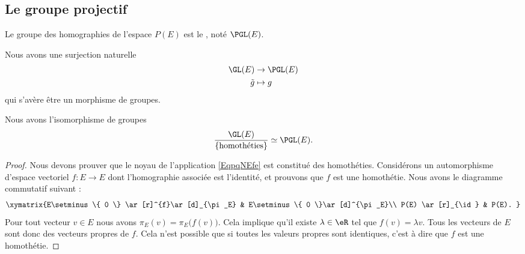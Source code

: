 \subsection{Le groupe projectif}

\begin{definition}
    Le groupe des homographies de l'espace \( P(E)\) est le , noté \( \PGL(E)\).
\end{definition}

Nous avons une surjection naturelle
\begin{equation}        \label{EqpqNEfe}
    \begin{aligned}
         \GL(E)&\to \PGL(E) \\
        \tilde g&\mapsto g 
    \end{aligned}
\end{equation}
qui s'avère être un morphisme de groupes.

\begin{proposition}
    Nous avons l'isomorphisme de groupes
    \begin{equation}
        \frac{ \GL(E) }{\{  \text{homothéties} \}}\simeq \PGL(E).
    \end{equation}
    
\end{proposition}

\begin{proof}
    Nous devons prouver que le noyau de l'application \eqref{EqpqNEfe} est constitué des homothéties. Considérons un automorphisme d'espace vectoriel \( f\colon E\to E\) dont l'homographie associée est l'identité, et prouvons que \( f\) est une homothétie. Nous avons le diagramme commutatif suivant :
    \begin{equation}
        \xymatrix{%
        E\setminus\{ 0 \} \ar[r]^{f}\ar[d]_{\pi_E}        &   E\setminus\{ 0 \}\ar[d]^{\pi_E}\\
           P(E) \ar[r]_{\id}   &   P(E).
           }
    \end{equation}
    Pour tout vecteur \( v\in E\) nous avons \( \pi_E(v)=\pi_E\big( f(v) \big)\). Cela implique qu'il existe \( \lambda\in\eR\) tel que \( f(v)=\lambda v\). Tous les vecteurs de \( E\) sont donc des vecteurs propres de \( f\). Cela n'est possible que si toutes les valeurs propres sont identiques, c'est à dire que \( f\) est une homothétie.
\end{proof}

